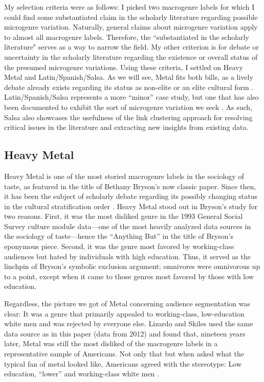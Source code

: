 \documentclass[a4paper,12pt]{extarticle}
\begin{document}
My selection criteria were as follows: I picked two macrogenre labels for which I could find some substantiated claim in the scholarly literature regarding possible microgenre variation. Naturally, general claims about microgenre variation apply to almost all macrogenre labels. Therefore, the ``substantiated in the scholarly literature" serves as a way to narrow the field. My other criterion is for debate or uncertainty in the scholarly literature regarding the existence or overall status of the presumed microgenre variations. Using these criteria, I settled on Heavy Metal and Latin/Spanish/Salsa. As we will see, Metal fits both bills, as a lively debate already exists regarding its status as non-elite or an elite cultural form \citep{tampubolon2008revisiting}. Latin/Spanish/Salsa represents a more ``minor'' case study, but one that has also been documented to exhibit the sort of microgenre variation we seek \citep{Bachmayer2014-pk}. As such, Salsa also showcases the usefulness of the link clustering approach for resolving critical issues in the literature and extracting new insights from existing data.

\subsection{Heavy Metal}
Heavy Metal is one of the most storied macrogenre labels in the sociology of taste, as featured in the title of Bethany Bryson's \citeyearpar{bryson96} now classic paper. Since then, it has been the subject of scholarly debate regarding its possibly changing status in the cultural stratification order \citep{tampubolon2008revisiting, goldberg2011mapping, lizardo_skiles15}. Heavy Metal stood out in Bryson's study for two reasons. First, it was the most disliked genre in the 1993 General Social Survey culture module data---one of the most heavily analyzed data sources in the sociology of taste---hence the ``Anything But'' in the title of Bryson's eponymous piece. Second, it was the genre most favored by working-class audiences but hated by individuals with high education. Thus, it served as the linchpin of Bryson's symbolic exclusion argument; omnivores were omnivorous up to a point, except when it came to those genres most favored by those with low education. 

Regardless, the picture we got of Metal concerning audience segmentation was clear: It was a genre that primarily appealed to working-class, low-education white men and was rejected by everyone else. Lizardo and Skiles \citeyearpar[][6, table 2]{lizardo_skiles16} used the same data source as in this paper (data from 2012) and found that, nineteen years later, Metal was still the most disliked of the macrogenre labels in a representative sample of Americans. Not only that but when asked what the typical fan of metal looked like, Americans agreed with the stereotype: Low education, ``lower'' and working-class white men \citep[][7, table 3]{lizardo_skiles16}. 
\end{document}
